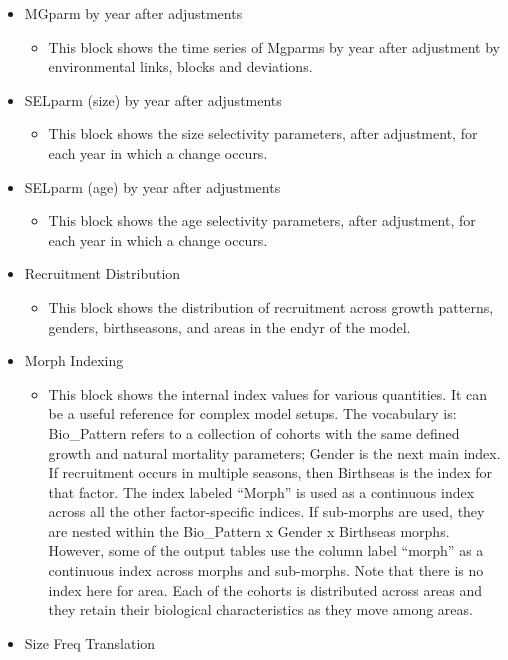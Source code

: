 \begin{itemize}
	\item MGparm by year after adjustments
	\begin{itemize}
		\item This block shows the time series of Mgparms by year after adjustment by environmental links, blocks and deviations.
	\end{itemize}
	\item SELparm (size) by year after adjustments
	\begin{itemize}
		\item This block shows the size selectivity parameters, after adjustment, for each year in which a change occurs.
	\end{itemize}
	\item SELparm (age) by year after adjustments
	\begin{itemize}
		\item This block shows the age selectivity parameters, after adjustment, for each year in which a change occurs.
	\end{itemize}
	\item Recruitment Distribution
	\begin{itemize}
		\item This block shows the distribution of recruitment across growth patterns, genders, birthseasons, and areas in the endyr of the model.
	\end{itemize}
	\item Morph Indexing
	\begin{itemize}
		\item This block shows the internal index values for various quantities.  It can be a useful reference for complex model setups.  The vocabulary is:  Bio\_Pattern refers to a collection of cohorts with the same defined growth and natural mortality parameters; Gender is the next main index.  If recruitment occurs in multiple seasons, then Birthseas is the index for that factor.  The index labeled “Morph” is used as a continuous index across all the other factor-specific indices.  If sub-morphs are used, they are nested within the Bio\_Pattern x Gender x Birthseas morphs.  However, some of the output tables use the column label “morph” as a continuous index across morphs and sub-morphs.  Note that there is no index here for area.  Each of the cohorts is distributed across areas and they retain their biological characteristics as they move among areas.
	\end{itemize}
	\item Size Freq Translation

\end{itemize}
